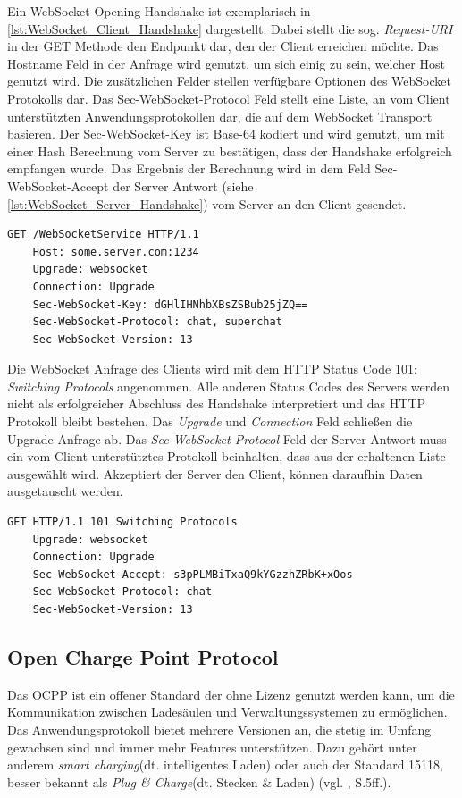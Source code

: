 \noindent Ein WebSocket Opening Handshake ist exemplarisch in \autoref{lst:WebSocket_Client_Handshake} dargestellt. Dabei stellt die sog. \textit{Request-URI} in der GET Methode den Endpunkt dar, den der Client erreichen möchte. Das Hostname Feld in der Anfrage wird genutzt, um sich einig zu sein, welcher Host genutzt wird. Die zusätzlichen Felder stellen verfügbare Optionen des WebSocket Protokolls dar. Das Sec-WebSocket-Protocol Feld stellt eine Liste, an vom Client unterstützten Anwendungsprotokollen dar, die auf dem WebSocket Transport basieren.
Der Sec-WebSocket-Key ist Base-64 kodiert und wird genutzt, um mit einer Hash Berechnung vom Server zu bestätigen, dass der Handshake erfolgreich empfangen wurde. Das Ergebnis der Berechnung wird in dem Feld Sec-WebSocket-Accept der Server Antwort (siehe \autoref{lst:WebSocket_Server_Handshake}) vom Server an den Client gesendet.\\

\begin{lstlisting}[caption={WebSocket Client Opening Handshake \cite{Eigene_Darstellung}}, label=lst:WebSocket_Client_Handshake, float]
	GET /WebSocketService HTTP/1.1
	Host: some.server.com:1234
	Upgrade: websocket
	Connection: Upgrade
	Sec-WebSocket-Key: dGHlIHNhbXBsZSBub25jZQ==
	Sec-WebSocket-Protocol: chat, superchat
	Sec-WebSocket-Version: 13
\end{lstlisting}

\noindent Die WebSocket Anfrage des Clients wird mit dem \acs{HTTP} Status Code 101: \textit{Switching Protocols} angenommen. Alle anderen Status Codes des Servers werden nicht als erfolgreicher Abschluss des Handshake interpretiert und das \acs{HTTP} Protokoll bleibt bestehen. Das \textit{Upgrade} und \textit{Connection} Feld schließen die Upgrade-Anfrage ab. Das \textit{Sec-WebSocket-Protocol} Feld der Server Antwort muss ein vom Client unterstütztes Protokoll beinhalten, dass aus der erhaltenen Liste ausgewählt wird. Akzeptiert der Server den Client, können daraufhin Daten ausgetauscht werden.\\
\begin{lstlisting}[caption={WebSocket Server Opening Handshake Antwort \cite{Eigene_Darstellung}}, label=lst:WebSocket_Server_Handshake, float]
	GET HTTP/1.1 101 Switching Protocols
	Upgrade: websocket
	Connection: Upgrade
	Sec-WebSocket-Accept: s3pPLMBiTxaQ9kYGzzhZRbK+xOos
	Sec-WebSocket-Protocol: chat
	Sec-WebSocket-Version: 13
\end{lstlisting}

\subsection{Open Charge Point Protocol}
Das \ac{OCPP} ist ein offener Standard der ohne Lizenz genutzt werden kann, um die Kommunikation zwischen Ladesäulen und Verwaltungssystemen zu ermöglichen. Das Anwendungsprotokoll bietet mehrere Versionen an, die stetig im Umfang gewachsen sind und immer mehr Features unterstützen. Dazu gehört unter anderem \textit{smart charging}(dt. intelligentes Laden) oder auch der  Standard 15118, besser bekannt als \textit{Plug \& Charge}(dt. Stecken \& Laden) (vgl. \cite{OCPP-2.0.1-part0-introduction}, S.5ff.).

